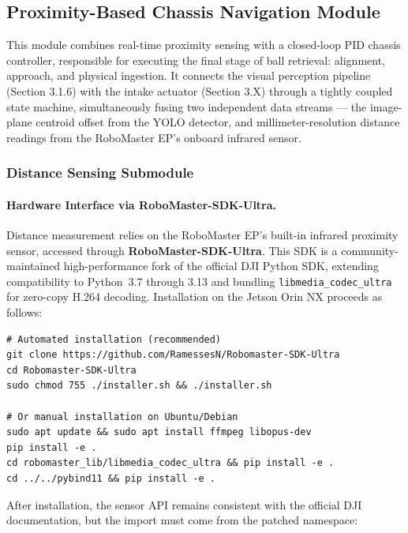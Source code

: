 \subsection{Proximity-Based Chassis Navigation Module}
\label{sec:chassis}
This module combines real-time proximity sensing with a closed-loop PID chassis controller, responsible for executing the final stage of ball retrieval: alignment, approach, and physical ingestion. It connects the visual perception pipeline (Section 3.1.6) with the intake actuator (Section 3.X) through a tightly coupled state machine, simultaneously fusing two independent data streams — the image-plane centroid offset from the YOLO detector, and millimeter-resolution distance readings from the RoboMaster EP's onboard infrared sensor.

\subsubsection{Distance Sensing Submodule}
\label{sec:distance_sub}

\paragraph{Hardware Interface via RoboMaster-SDK-Ultra.}
Distance measurement relies on the RoboMaster EP's built-in infrared proximity sensor, accessed through
\textbf{RoboMaster-SDK-Ultra}. This SDK is a community-maintained high-performance fork of the official DJI Python SDK,
extending compatibility to Python~3.7 through 3.13 and bundling
\texttt{libmedia\_codec\_ultra} for zero-copy H.264 decoding.
Installation on the Jetson Orin NX proceeds as follows:

\begin{verbatim}
# Automated installation (recommended)
git clone https://github.com/RamessesN/Robomaster-SDK-Ultra
cd Robomaster-SDK-Ultra
sudo chmod 755 ./installer.sh && ./installer.sh

# Or manual installation on Ubuntu/Debian
sudo apt update && sudo apt install ffmpeg libopus-dev
pip install -e .
cd robomaster_lib/libmedia_codec_ultra && pip install -e .
cd ../../pybind11 && pip install -e .
\end{verbatim}

After installation, the sensor API remains consistent with the official DJI documentation, but the import must come from the patched namespace:

